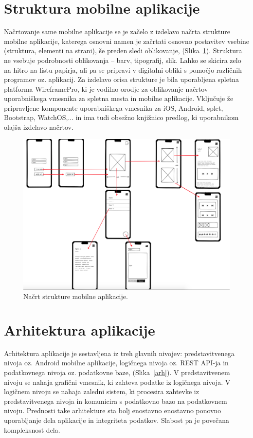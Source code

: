\documentclass[a4paper, 12pt]{book}
\begin{document}
\section{Struktura mobilne aplikacije}
Načrtovanje same mobilne aplikacije se je začelo z izdelavo načrta strukture mobilne aplikacije,  katerega osnovni namen je začrtati osnovno postavitev vsebine (struktura, elementi na strani), še preden sledi oblikovanje, (Slika~\ref{wireframe}). Struktura ne vsebuje podrobnosti oblikovanja – barv, tipografij, slik. Lahko se skicira zelo na hitro na listu papirja, ali pa se pripravi v digitalni obliki s pomočjo različnih programov oz. aplikacij. Za izdelavo orisa strukture je bila uporabljena spletna platforma WireframePro, ki je vodilno orodje za oblikovanje načrtov uporabniškega vmesnika za spletna mesta in mobilne aplikacije. Vključuje že pripravljene komponente uporabniškega vmesnika za iOS, Android, splet, Bootstrap, WatchOS,... in ima tudi obsežno knjižnico predlog, ki uporabnikom olajša izdelavo načrtov.\\

\begin{figure}[htbp]
\begin{center}
\includegraphics[scale=.35]{wireframes.png}
\end{center}
\caption{Načrt strukture mobilne aplikacije.}
\label{wireframe}
\end{figure}


\section{Arhitektura aplikacije}
Arhitektura aplikacije je sestavljena iz treh glavnih nivojev: predstavitvenega nivoja oz. Android mobilne aplikacije, logičnega nivoja oz. REST API-ja in podatkovnega nivoja oz. podatkovne baze, (Slika~\ref{arh}). V predstavitvenem nivoju se nahaja grafični vmesnik, ki zahteva podatke iz logičnega nivoja. V logičnem nivoju se nahaja zaledni sistem, ki procesira zahtevke iz predstavitvenega nivoja in komunicira s podatkovno bazo na podatkovnem nivoju. Prednosti take arhitekture sta bolj enostavno enostavno ponovno uporabljanje dela aplikacije in integriteta podatkov. Slabost pa je povečana kompleksnost dela.
\end{document}
